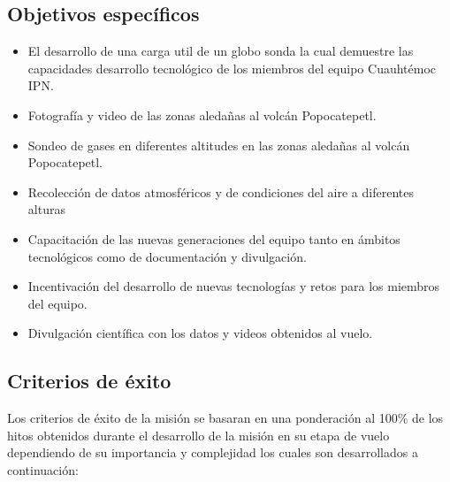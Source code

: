 \documentclass[letterpaper,12pt]{article} %
\begin{document}
    \subsection{Objetivos específicos}
    \begin{itemize}
        \item El desarrollo de una carga util de un globo sonda la cual demuestre las capacidades desarrollo tecnológico de los miembros del equipo Cuauhtémoc IPN.
        \item Fotografía y video de las zonas aledañas al volcán Popocatepetl.
        \item Sondeo de gases en diferentes altitudes en las zonas aledañas al volcán Popocatepetl.
        \item Recolección de datos atmosféricos y de condiciones del aire a diferentes alturas
        \item Capacitación de las nuevas generaciones del equipo tanto en ámbitos tecnológicos como de documentación y divulgación.
        \item Incentivación del desarrollo de nuevas tecnologías y retos para los miembros del equipo.
        \item Divulgación científica con los datos y videos obtenidos al vuelo.
        
    \end{itemize}    

    \newpage
    
    \subsection{Criterios de éxito}

    Los criterios de éxito de la misión se basaran en una ponderación al 100\% de los hitos obtenidos durante el desarrollo de la misión en su etapa de vuelo dependiendo de su importancia y complejidad los cuales son desarrollados a continuación:
\end{document}
